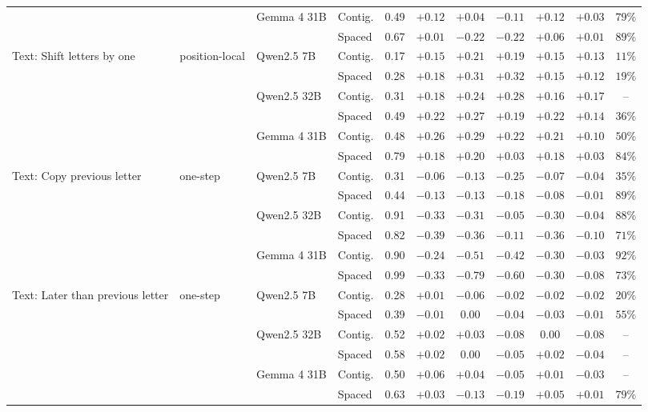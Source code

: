 \begin{tabular}{llll cc cc cc c}
 &  & Gemma 4 31B & Contig. & 0.49 & $+0.12$ & $+0.04$ & $-0.11$ & $+0.12$ & $+0.03$ & $79\%$ \\
 &  &  & Spaced & 0.67 & $+0.01$ & $-0.22$ & $-0.22$ & $+0.06$ & $+0.01$ & $89\%$ \\
\addlinespace
Text: Shift letters by one & position-local & Qwen2.5 7B & Contig. & 0.17 & $+0.15$ & $+0.21$ & $+0.19$ & $+0.15$ & $+0.13$ & $11\%$ \\
 &  &  & Spaced & 0.28 & $+0.18$ & $\mathbf{+0.31}$ & $+0.32$ & $+0.15$ & $+0.12$ & $19\%$ \\
 &  & Qwen2.5 32B & Contig. & 0.31 & $+0.18$ & $+0.24$ & $+0.28$ & $+0.16$ & $+0.17$ & -- \\
 &  &  & Spaced & 0.49 & $+0.22$ & $\mathbf{+0.27}$ & $+0.19$ & $+0.22$ & $+0.14$ & $36\%$ \\
 &  & Gemma 4 31B & Contig. & 0.48 & $+0.26$ & $\mathbf{+0.29}$ & $+0.22$ & $+0.21$ & $+0.10$ & $50\%$ \\
 &  &  & Spaced & 0.79 & $+0.18$ & $+0.20$ & $+0.03$ & $+0.18$ & $+0.03$ & $84\%$ \\
\addlinespace
Text: Copy previous letter & one-step & Qwen2.5 7B & Contig. & 0.31 & $-0.06$ & $-0.13$ & $-0.25$ & $-0.07$ & $-0.04$ & $35\%$ \\
 &  &  & Spaced & 0.44 & $-0.13$ & $-0.13$ & $-0.18$ & $-0.08$ & $-0.01$ & $89\%$ \\
 &  & Qwen2.5 32B & Contig. & 0.91 & $-0.33$ & $\mathbf{-0.31}$ & $-0.05$ & $-0.30$ & $-0.04$ & $88\%$ \\
 &  &  & Spaced & 0.82 & $-0.39$ & $\mathbf{-0.36}$ & $-0.11$ & $-0.36$ & $-0.10$ & $71\%$ \\
 &  & Gemma 4 31B & Contig. & 0.90 & $-0.24$ & $\mathbf{-0.51}$ & $-0.42$ & $-0.30$ & $-0.03$ & $92\%$ \\
 &  &  & Spaced & 0.99 & $-0.33$ & $\mathbf{-0.79}$ & $-0.60$ & $-0.30$ & $-0.08$ & $73\%$ \\
\addlinespace
Text: Later than previous letter & one-step & Qwen2.5 7B & Contig. & 0.28 & $+0.01$ & $-0.06$ & $-0.02$ & $-0.02$ & $-0.02$ & $20\%$ \\
 &  &  & Spaced & 0.39 & $-0.01$ & $0.00$ & $-0.04$ & $-0.03$ & $-0.01$ & $55\%$ \\
 &  & Qwen2.5 32B & Contig. & 0.52 & $+0.02$ & $+0.03$ & $-0.08$ & $0.00$ & $-0.08$ & -- \\
 &  &  & Spaced & 0.58 & $+0.02$ & $0.00$ & $-0.05$ & $+0.02$ & $-0.04$ & -- \\
 &  & Gemma 4 31B & Contig. & 0.50 & $+0.06$ & $+0.04$ & $-0.05$ & $+0.01$ & $-0.03$ & -- \\
 &  &  & Spaced & 0.63 & $+0.03$ & $-0.13$ & $-0.19$ & $+0.05$ & $+0.01$ & $79\%$ \\
\bottomrule
\end{tabular}
